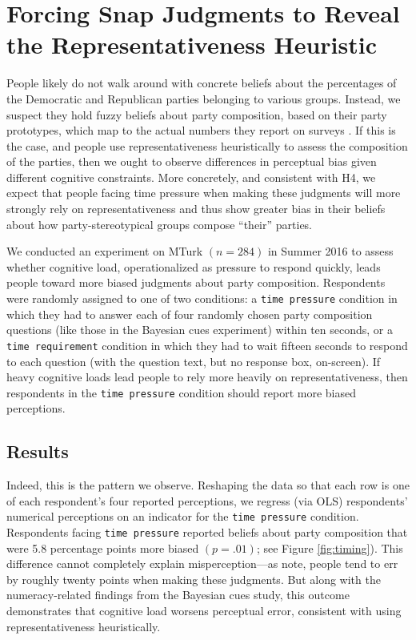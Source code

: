 \documentclass[12pt, letterpaper]{article}
\begin{document}
\section{Forcing Snap Judgments to Reveal the Representativeness Heuristic}

People likely do not walk around with concrete beliefs about the percentages of the Democratic and Republican parties belonging to various groups. Instead, we suspect they hold fuzzy beliefs about party composition, based on their party prototypes, which map to the actual numbers they report on surveys \citep{ahler2017}. If this is the case, and people use representativeness heuristically to assess the composition of the parties, then we ought to observe differences in perceptual bias given different cognitive constraints. More concretely, and consistent with H4, we expect that people facing time pressure when making these judgments will more strongly rely on representativeness and thus show greater bias in their beliefs about how party-stereotypical groups compose ``their'' parties.

We conducted an experiment on MTurk $(n=284)$ in Summer 2016 to assess whether cognitive load, operationalized as pressure to respond quickly, leads people toward more biased judgments about party composition. Respondents were randomly assigned to one of two conditions: a {\tt time pressure} condition in which they had to answer each of four randomly chosen party composition questions (like those in the Bayesian cues experiment) within ten seconds, or a {\tt time requirement} condition in which they had to wait fifteen seconds to respond to each question (with the question text, but no response box, on-screen). If heavy cognitive loads lead people to rely more heavily on representativeness, then respondents in the {\tt time pressure} condition should report more biased perceptions.

\subsection{Results}

Indeed, this is the pattern we observe. Reshaping the data so that each row is one of each respondent's four reported perceptions, we regress (via OLS) respondents' numerical perceptions on an indicator for the {\tt time pressure} condition. Respondents facing {\tt time pressure} reported beliefs about party composition that were 5.8 percentage points more biased $(p=.01)$; see Figure \ref{fig:timing}). This difference cannot completely explain misperception---as \citet{ahler2018parties} note, people tend to err by roughly twenty points when making these judgments. But along with the numeracy-related findings from the Bayesian cues study, this outcome demonstrates that cognitive load worsens perceptual error, consistent with using representativeness heuristically.
\end{document}
